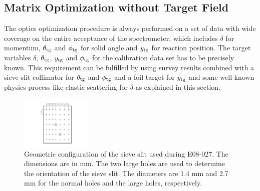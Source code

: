 \subsection{Matrix Optimization without Target Field}
\label{C6S2SS2}

The optics optimization procedure is always performed on a set of data with wide coverage on the entire acceptance of the spectrometer, which includes $\delta$ for momentum, $\theta_{\mathrm{tg}}$ and $\phi_{\mathrm{tg}}$ for solid angle and $y_{\mathrm{tg}}$ for reaction position. The target variables $\delta$, $\theta_{\mathrm{tg}}$, $y_{\mathrm{tg}}$ and $\phi_{\mathrm{tg}}$ for the calibration data set has to be precisely known. This requirement can be fulfilled by using survey results combined with a sieve-slit collimator for $\theta_{\mathrm{tg}}$ and $\phi_{\mathrm{tg}}$ and a foil target for $y_{\mathrm{tg}}$ and some well-known physics process like elastic scattering for $\delta$ as explained in this section.

\begin{figure}[tb!]
  \centering
  \includegraphics[width=0.3\textwidth]{figs/sieve-slit.pdf}
  \caption[Geometric configuration of the sieve slit.]{Geometric configuration of the sieve slit used during E08-027. The dimensions are in mm. The two large holes are used to determine the orientation of the sieve slit. The diameters are 1.4 mm and 2.7 mm for the normal holes and the large holes, respectively. \label{C6S2SS2F1}}
\end{figure}

